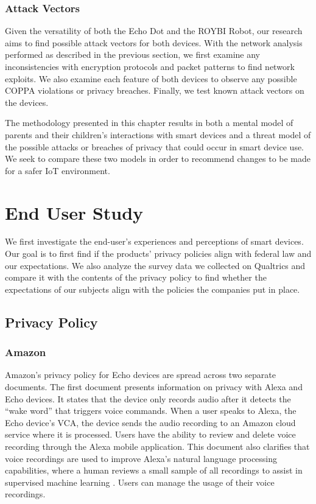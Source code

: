 \documentclass[12pt]{ucthesis}
\begin{document}
\subsection{Attack Vectors}
Given the versatility of both the Echo Dot and the ROYBI Robot, our research aims to find possible attack vectors for both devices. With the network analysis performed as described in the previous section, we first examine any inconsistencies with encryption protocols and packet patterns to find network exploits. We also examine each feature of both devices to observe any possible COPPA violations or privacy breaches. Finally, we test known attack vectors on the devices. 

The methodology presented in this chapter results in both a mental model of parents and their children's interactions with smart devices and a threat model of the possible attacks or breaches of privacy that could occur in smart device use. We seek to compare these two models in order to recommend changes to be made for a safer IoT environment.

\chapter{End User Study}
\label{ch:mental}
We first investigate the end-user's experiences and perceptions of smart devices. Our goal is to first find if the products' privacy policies align with federal law and our expectations. We also analyze the survey data we collected on Qualtrics and compare it with the contents of the privacy policy to find whether the expectations of our subjects align with the policies the companies put in place.

\section{Privacy Policy}
\subsection{Amazon}
Amazon's privacy policy for Echo devices are spread across two separate documents. The first document presents information on privacy with Alexa and Echo devices. It states that the device only records audio after it detects the ``wake word'' that triggers voice commands. When a user speaks to Alexa, the Echo device's VCA, the device sends the audio recording to an Amazon cloud service where it is processed. Users have the ability to review and delete voice recording through the Alexa mobile application. This document also clarifies that voice recordings are used to improve Alexa's natural language processing capabilities, where a human reviews a small sample of all recordings to assist in supervised machine learning \cite{supervised}. Users can manage the usage of their voice recordings.
\end{document}
